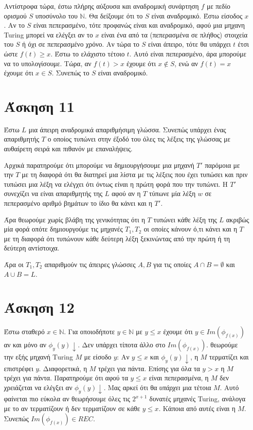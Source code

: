 \documentclass[a4paper, oneside, 11pt]{article}
\theoremstyle{definition}
\begin{document}
Αντίστροφα τώρα, έστω πλήρης αύξουσα και αναδρομική συνάρτηση $f$ με πεδίο ορισμού $S$
υποσύνολο του $\mathbb{N}$. Θα δείξουμε ότι το $S$ είναι αναδρομικό.
Έστω είσοδος $x$. 
Αν το $S$ είναι πεπερασμένο, τότε προφανώς είναι και αναδρομικό, αφού μια μηχανη Turing
μπορεί να ελέγξει αν το $x$ είναι ένα από τα (πεπερασμένα σε πλήθος) στοιχεία του $S$
ή όχι σε πεπερασμένο χρόνο. Αν τώρα το $S$ είναι άπειρο, τότε θα υπάρχει $t$ έτσι
ώστε $f(t) \geq x$. Έστω το ελάχιστο τέτοιο $t$. Αυτό είναι πεπερασμένο, άρα μπορούμε
να το υπολογίσουμε. Τώρα, αν $f(t) > x$ έχουμε ότι $x\notin S$, ενώ αν $f(t) = x$
έχουμε ότι $x\in S$. Συνεπώς το $S$ είναι αναδρομικό.

\section*{Άσκηση 11}

Έστω $L$ μια άπειρη αναδρομικά απαριθμήσιμη γλώσσα. Συνεπώς υπάρχει ένας απαριθμητής
$T$ ο οποίος τυπώνει στην έξοδό του όλες τις λέξεις της γλώσσας με αυθαίρετη σειρά
και πιθανόν με επαναλήψεις.

Αρχικά παρατηρούμε ότι μπορούμε να δημιουργήσουμε μια μηχανή $T'$ παρόμοια με την $T$
με τη διαφορά ότι θα διατηρεί μια λίστα με τις λέξεις που έχει τυπώσει και πριν
τυπώσει μια λέξη να ελέγχει ότι όντως είναι η πρώτη φορά που την τυπώνει. H $T'$
συνεχίζει να είναι απαριθμητής της $L$ αφού αν η $T$ τύπωνε μία λέξη $w$ σε
πεπερασμένο αριθμό βημάτων το ίδιο θα κάνει και η $T'$.

Άρα θεωρούμε χωρίς βλάβη της γενικότητας ότι η $T$ τυπώνει κάθε λέξη της $L$ ακριβώς
μία φορά οπότε δημιουργούμε τις μηχανές $T_1, T_2$ οι οποίες κάνουν ό,τι κάνει και η
$T$ με τη διαφορά ότι τυπώνουν κάθε δεύτερη λέξη ξεκινώντας από την πρώτη ή τη
δεύτερη αντίστοιχα.

Άρα οι $T_1, T_2$ απαριθμούν τις άπειρες γλώσσες $A, B$ για τις οποίες $A \cap B =
\emptyset$ και $A \cup B = L$.

\section*{Άσκηση 12}

Έστω σταθερό $x\in \mathbb{N}$. Για οποιοδήποτε $y\in \mathbb{N}$ με $y\leq x$ έχουμε
ότι $y\in Im(\phi_{f(x)})$ αν και μόνο αν $\phi_y(y)\downarrow$. Δεν υπάρχει τίποτα 
άλλο στο $Im(\phi_{f(x)})$. θεωρούμε την εξής μηχανή Τuring $M$ με είσοδο $y$:
Αν $y\leq x$ και $\phi_y(y)\downarrow$, η $M$ τερματίζει και επιστρέφει $y$. 
Διαφορετικά, η $M$ τρέχει για πάντα. Επίσης για όλα τα $y>x$ η $M$ τρέχει για πάντα. 
Παρατηρούμε ότι αφού τα $y\leq x$ είναι πεπερασμένα, η $M$ δεν χρειάζεται να ελέγξει
αν $\phi_y(y)\downarrow$. Μας αρκεί ότι θα \textit{υπάρχει} μια τέτοια $M$. Αυτό φαίνεται
πιο εύκολα αν θεωρήσουμε όλες τις $2^{x+1}$ δυνατές μηχανές Turing, ανάλογα με το αν 
τερματίζουν ή δεν τερματίζουν σε κάθε $y\leq x$. Kάποια από αυτές είναι η $M$.
Συνεπώς $Ιm(\phi_{f(x)})\in REC$.
\end{document}
